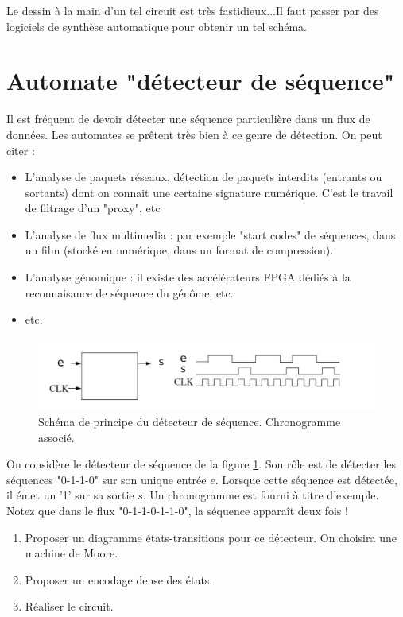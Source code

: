 \documentclass[a4paper,11pt]{article}
\begin{document}
Le dessin à la main d'un tel circuit est très fastidieux...Il faut passer par des logiciels de synthèse automatique pour obtenir
un tel schéma.


\section{Automate "détecteur de séquence"}

Il est fréquent de devoir détecter une séquence particulière dans un flux de données. Les automates se prêtent très bien à ce genre de détection. On peut citer :
\begin{itemize}
  \item L'analyse de paquets réseaux, détection de paquets interdits (entrants ou sortants) dont on connait une certaine signature numérique. C'est le travail de filtrage d'un "proxy", etc
  \item L'analyse de flux multimedia : par exemple "start codes" de séquences, dans un film (stocké en numérique, dans un format de compression).
  \item L'analyse génomique : il existe des accélérateurs FPGA dédiés à la reconnaisance de séquence du génôme, etc.
  \item etc.
\end{itemize}

\begin{figure}[!h]
  \begin{center}
    \includegraphics[scale=0.3]{./figures/exo2}
  \end{center}
  \caption{Schéma de principe du détecteur de séquence. Chronogramme associé.}
  \label{exo2}
\end{figure}

On considère le détecteur de séquence de la figure \ref{exo2}. Son rôle est de détecter les séquences "0-1-1-0" sur son unique entrée $e$.
Lorsque cette séquence est détectée, il émet un '1' sur sa sortie $s$. Un chronogramme est fourni à titre d'exemple. Notez que dans le flux
"0-1-1-0-1-1-0", la séquence apparaît deux fois !
\begin{enumerate}
  \item Proposer un diagramme états-transitions pour ce détecteur. On choisira une machine de Moore.
  \item Proposer un encodage dense des états.
  \item Réaliser le circuit.
\end{enumerate}
\end{document}
